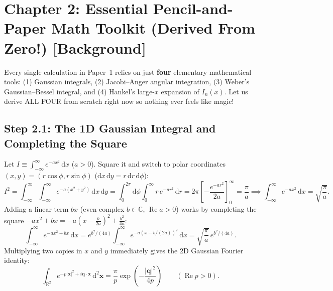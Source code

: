 \documentclass[10pt,letterpaper]{article}
\newcommand{\abs}[1]{\lvert #1 \rvert}
\newcommand{\dd}{\mathrm{d}}
\newcommand{\bgtag}{\textcolor{tealborder}{\textbf{[Background]}}}
\numberwithin{equation}{section}
\begin{document}
\section{Chapter 2: Essential Pencil-and-Paper Math Toolkit (Derived From Zero!) \bgtag{}}
\label{sec:c2}

\begin{whystep}
Every single calculation in Paper~1 relies on just \textbf{four} elementary mathematical tools: (1) Gaussian integrals, (2) Jacobi--Anger angular integration, (3) Weber's Gaussian--Bessel integral, and (4) Hankel's large-$x$ expansion of $I_n(x)$. Let us derive ALL FOUR from scratch right now so nothing ever feels like magic!
\end{whystep}

\subsection{Step 2.1: The 1D Gaussian Integral and Completing the Square}

Let $I \equiv \int_{-\infty}^\infty e^{-ax^2}\,\dd x$ ($a > 0$). Square it and switch to polar coordinates $(x,y) = (r\cos\phi, r\sin\phi)$ ($\dd x\,\dd y = r\,\dd r\,\dd\phi$):
\begin{equation}
  I^2 = \int_{-\infty}^\infty\!\!\int_{-\infty}^\infty e^{-a(x^2+y^2)}\,\dd x\,\dd y = \int_0^{2\pi}\dd\phi \int_0^\infty r\,e^{-ar^2}\,\dd r = 2\pi\left[-\frac{e^{-ar^2}}{2a}\right]_0^\infty = \frac{\pi}{a}
  \implies \int_{-\infty}^\infty e^{-ax^2}\,\dd x = \sqrt{\frac{\pi}{a}}.
  \label{eq:c2_gauss}
\end{equation}
Adding a linear term $bx$ (even complex $b \in \mathbb{C}$, $\operatorname{Re} a > 0$) works by completing the square $-ax^2 + bx = -a(x - \frac{b}{2a})^2 + \frac{b^2}{4a}$:
\begin{equation}
  \int_{-\infty}^\infty e^{-ax^2 + bx}\,\dd x = e^{b^2/(4a)}\int_{-\infty}^\infty e^{-a(x - b/(2a))^2}\,\dd x = \sqrt{\frac{\pi}{a}}\,e^{b^2/(4a)}.
  \label{eq:c2_gauss_shift}
\end{equation}
Multiplying two copies in $x$ and $y$ immediately gives the 2D Gaussian Fourier identity:
\begin{equation}
  \int_{\mathbb{R}^2} e^{-p\abs{\mathbf{x}}^2 + i\mathbf{q}\cdot\mathbf{x}}\,\dd^2\mathbf{x} = \frac{\pi}{p}\exp\!\left(-\frac{\abs{\mathbf{q}}^2}{4p}\right) \qquad (\operatorname{Re} p > 0).
  \label{eq:c2_gauss_2d}
\end{equation}
\end{document}
